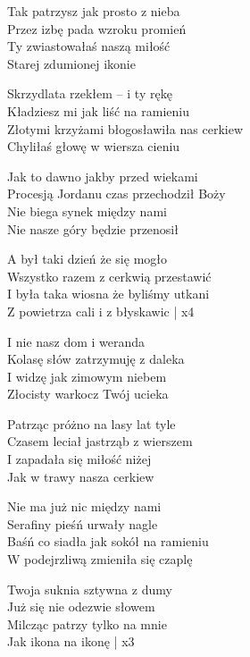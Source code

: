 \begin{textn}
    Tak patrzysz jak prosto z nieba\\
    Przez izbę pada wzroku promień\\
    Ty zwiastowałaś naszą miłość\\
    Starej zdumionej ikonie

    Skrzydlata rzekłem – i ty rękę\\
    Kładziesz mi jak liść na ramieniu\\
    Złotymi krzyżami błogosławiła nas cerkiew\\
    Chyliłaś głowę w wiersza cieniu

    \vin Jak to dawno jakby przed wiekami\\
    \vin Procesją Jordanu czas przechodził Boży\\
    \vin Nie biega synek między nami\\
    \vin Nie nasze góry będzie przenosił

    \vin A był taki dzień że się mogło\\
    \vin Wszystko razem z cerkwią przestawić\\
    \vin I była taka wiosna że byliśmy utkani\\
    \vin Z powietrza cali i z błyskawic | x4

    I nie nasz dom i weranda\\
    Kolasę słów zatrzymuję z daleka\\
    I widzę jak zimowym niebem\\
    Złocisty warkocz Twój ucieka

    Patrząc próżno na lasy lat tyle\\
    Czasem leciał jastrząb z wierszem\\
    I zapadała się miłość niżej\\
    Jak w trawy nasza cerkiew

    Nie ma już nic między nami\\
    Serafiny pieśń urwały nagle\\
    Baśń co siadła jak sokół na ramieniu\\
    W podejrzliwą zmieniła się czaplę

    Twoja suknia sztywna z dumy\\
    Już się nie odezwie słowem\\
    Milcząc patrzy tylko na mnie\\
    Jak ikona na ikonę | x3
\end{textn}
